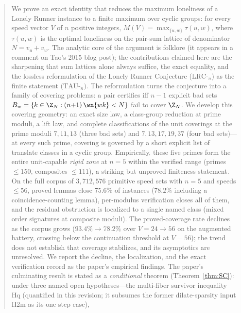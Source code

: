 
\begin{abstract}
\noindent
We prove an exact identity that reduces the maximum loneliness of a Lonely
Runner instance to a finite maximum over cyclic groups: for every speed
vector $V$ of $n$ positive integers,
$M(V)=\max_{\{u,w\}}\tau(u,w)$, where $\tau(u,w)$ is the optimal loneliness
on the pair-sum lattice of denominator $N=v_u+v_w$. The analytic core of the
argument is folklore (it appears in a comment on Tao's 2015 blog post); the
contributions claimed here are the sharpening that sum lattices alone always
suffice, the exact equality, and the lossless reformulation of the Lonely
Runner Conjecture ($\mathrm{LRC}$-$_n$) as the finite statement
$(\mathrm{TAU}$-$_n)$. The reformulation turns the conjecture into a family
of covering problems: a pair certifies iff $n-1$ explicit bad sets
$B_w=\{k\in\Z_N : (n{+}1)\,\wn{wk}<N\}$ fail to cover $\Z_N$. We develop
this covering geometry: an exact size law, a class-group reduction at prime
moduli, a lift law, and complete classifications of the unit coverings at
the prime moduli $7,11,13$ (three bad sets) and $7,13,17,19,37$ (four bad
sets)---at every such prime, covering is governed by a short explicit list
of translate classes in a cyclic group. Empirically, these five primes form
the entire unit-capable \emph{rigid zone} at $n=5$ within the verified range
(primes $\le 150$, composites $\le 111$), a striking but unproved finiteness
statement. On the full corpus of $3{,}712{,}576$ primitive speed sets with
$n=5$ and speeds $\le 56$, proved lemmas close $75.6\%$ of instances
($78.2\%$ including a coincidence-counting lemma), per-modulus verification
closes all of them, and the residual obstruction is localized to a single
named class (mixed order signatures at composite moduli). The proved-coverage
rate declines as the corpus grows ($93.4\%\to78.2\%$ over $V=24\to56$ on the
augmented battery, crossing below the continuation threshold at $V=56$);
the trend does not establish that coverage stabilizes, and its asymptotics
are unresolved. We report the decline, the localization, and the exact
verification record as the paper's empirical findings.
The paper's culminating result is stated as a \emph{conditional}
theorem (Theorem~\ref{thm:SC}): under three named open hypotheses---the
multi-fiber survivor inequality Hq (quantified in this revision; it
subsumes the former dilate-sparsity input H2m as its one-step case),

\end{abstract}
